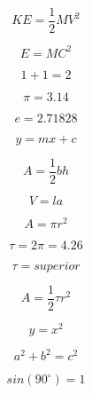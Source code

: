 \documentclass[12pt, a4paper, oneside]{article}
\begin{document}
	$$ KE = \frac{1}{2} M V^{2} $$

	$$ E=MC^{2} $$

	$$ {1} + {1} = {2} $$

	$$ \pi={3.14} $$

	$$ e={2.71828} $$

	$$ y=mx+c $$

	$$ A=\frac{1}{2}bh $$

	$$ V=la $$

	$$ A=\pi{r}^2 $$

	$$ \tau={2}\pi={4.26} $$

	$$ \tau=superior $$

	$$ A=\frac{1}{2}\tau{r}^2 $$

	$$ y=x^{2} $$

	$$ a^{2}+b^{2}=c^{2} $$
	
	$$ sin({90}^\circ)={1} $$
\end{document}

